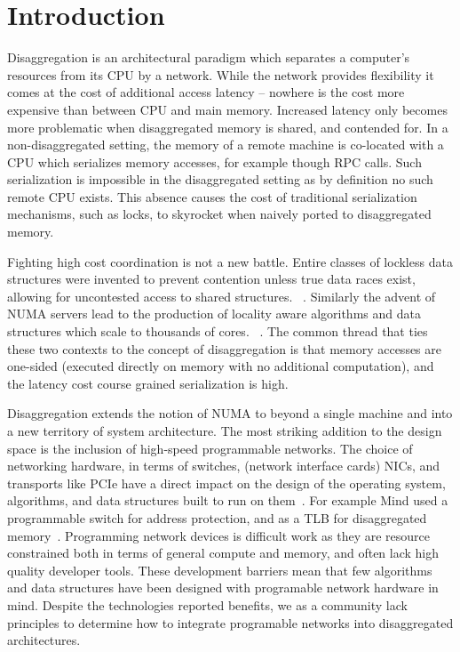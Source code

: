 \section{Introduction}
Disaggregation is an architectural paradigm which separates a computer's
resources from its CPU by a network. While the network provides flexibility it
comes at the cost of additional access latency
-- nowhere is the cost more expensive than between CPU and main memory.
Increased latency only becomes more problematic when disaggregated memory is
shared, and contended for. In a non-disaggregated setting, the memory of a
remote machine is co-located with a CPU which serializes memory accesses, for
example though RPC calls. Such serialization is impossible in the disaggregated
setting as by definition no such remote CPU exists.  This absence causes the
cost of traditional serialization mechanisms, such as locks, to skyrocket when
naively ported to disaggregated memory.

Fighting high cost coordination is not a new battle. Entire classes of lockless
data structures were invented to prevent contention unless true data races
exist, allowing for uncontested access to shared structures.
~\cite{simple-fast,lock-free-skip,non-block-binary,read-concur-btree,lock-free-btree}.
Similarly the advent of NUMA servers lead to the production of locality aware
algorithms and data structures which scale to thousands of cores.
~\cite{linux-scale,black-box-numa}. The common thread
that ties these two contexts to the concept of disaggregation is that memory
accesses are one-sided (executed directly on memory with no additional
computation), and the latency cost course grained serialization is high.

Disaggregation extends the notion of NUMA to beyond a single machine and into a
new territory of system architecture. The most striking addition to the design
space is the inclusion of high-speed programmable networks. The choice of
networking hardware, in terms of switches, (network interface cards) NICs, and
transports like PCIe have a direct impact on the design of the operating system,
algorithms, and data structures built to run on
them~\cite{dredbox,firebox,machine,legoos,supernic}.  For example Mind used a
programmable switch for address protection, and as a TLB for disaggregated
memory~\cite{mind}.  Programming network devices is difficult work as they are
resource constrained both in terms of general compute and memory, and often lack
high quality developer tools. These development barriers mean that few
algorithms and data structures have been designed with programable network
hardware in mind. Despite the technologies reported benefits, we as a community
lack principles to determine how to integrate programable networks into
disaggregated architectures.

